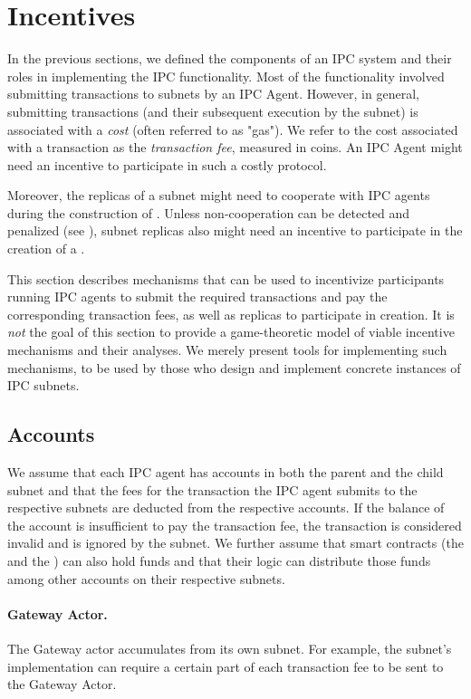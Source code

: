 \section{Incentives}
\label{sec:incentives}

In the previous sections, we defined the components of an IPC system and their roles in implementing the IPC functionality.
Most of the functionality involved submitting transactions to subnets by an IPC Agent.
However, in general, submitting transactions (and their subsequent execution by the subnet) is associated with a \emph{cost} (often referred to as "gas").
We refer to the cost associated with a transaction as the \emph{transaction fee}, measured in coins.
An IPC Agent might need an incentive to participate in such a costly protocol.

Moreover, the replicas of a subnet might need to cooperate with IPC agents during the construction of \pofsFull.
Unless non-cooperation can be detected and penalized (see ), subnet replicas also might need an incentive to participate in the creation of a \pof.

This section describes mechanisms that can be used to incentivize participants running IPC agents
to submit the required transactions and pay the corresponding transaction fees,
as well as replicas to participate in \pof creation.
It is \emph{not} the goal of this section to provide a game-theoretic model of viable incentive mechanisms and their analyses.
We merely present tools for implementing such mechanisms, to be used by those who design and implement concrete instances of IPC subnets.


\subsection{Accounts}

We assume that each IPC agent has accounts in both the parent and the child subnet
and that the fees for the transaction the IPC agent submits to the respective subnets are deducted from the respective accounts.
If the balance of the account is insufficient to pay the transaction fee, the transaction is considered invalid and is ignored by the subnet.
We further assume that smart contracts (the \sa and the \gw) can also hold funds and that their logic can distribute those funds among other accounts on their respective subnets.

\paragraph{Gateway Actor.}
The Gateway actor accumulates from its own subnet. For example, the subnet's implementation can require a certain part of each transaction fee to be sent to the Gateway Actor.

